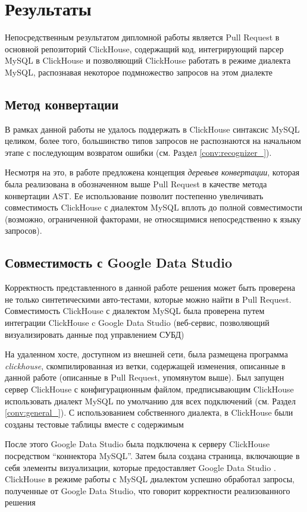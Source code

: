 \section{Результаты} \label{chap:results}
Непосредственным результатом дипломной работы является Pull Request в основной репозиторий ClickHouse, содержащий код, интегрирующий парсер MySQL в ClickHouse и позволяющий ClickHouse работать в режиме диалекта MySQL, распознавая некоторое подмножество запросов на этом диалекте

\subsection{Метод конвертации}
В рамках данной работы не удалось поддержать в ClickHouse синтаксис MySQL целиком, более того, большинство типов запросов не распознаются на начальном этапе с последующим возвратом ошибки (см. Раздел \ref{conv:recognizer_}).

Несмотря на это, в работе предложена концепция \textit{деревьев конвертации}, которая была реализована в обозначенном выше Pull Request в качестве метода конвертации AST. Ее использование позволит постепенно увеличивать совместимость ClickHouse с диалектом MySQL вплоть до полной совместимости (возможно, ограниченной факторами, не относящимися непосредственно к языку запросов). 

\subsection{Совместимость с Google Data Studio} \label{res:google}
Корректность представленного в данной работе решения может быть проверена не только синтетическими авто-тестами, которые можно найти в Pull Request. Совместимость ClickHouse с диалектом MySQL была проверена путем интеграции ClickHouse c Google Data Studio (веб-сервис, позволяющий визуализировать данные под управлением СУБД)

На удаленном хосте, доступном из внешней сети, была размещена программа \textit{clickhouse}, скомпилированная из ветки, содержащей изменения, описанные в данной работе (описанные в Pull Request, упомянутом выше). Был запущен сервер ClickHouse с конфигурационным файлом, предписывающим ClickHouse использовать диалект MySQL по умолчанию для всех подключений (см. Раздел \ref{conv:general_}). С использованием собственного диалекта, в ClickHouse были созданы тестовые таблицы вместе с содержимым

После этого Google Data Studio была подключена к серверу ClickHouse посредством \enquote{коннектора MySQL}. Затем была создана страница, включающие в себя элементы визуализации, которые предоставляет Google Data Studio \cite{data_studio_test}. ClickHouse в режиме работы с MySQL диалектом успешно обработал запросы, полученные от Google Data Studio, что говорит корректности реализованного решения

